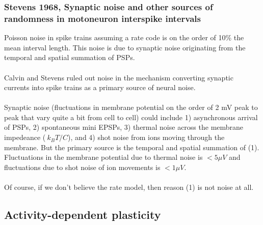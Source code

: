 \documentclass{article}
\begin{document}
\subsubsection{Stevens 1968, Synaptic noise and other sources of randomness in motoneuron interspike intervals}
Poisson noise in spike trains assuming a rate code is on the order of 10\% the mean interval length.  This noise is due to synaptic noise originating from the temporal and spatial summation of PSPs.\\
\\
Calvin and Stevens ruled out noise in the mechanism converting synaptic currents into spike trains as a primary source of neural noise.\\
\\
Synaptic noise (fluctuations in membrane potential on the order of 2 mV peak to peak that vary quite a bit from cell to cell) could include 1) asynchronous arrival of PSPs, 2) spontaneous mini EPSPs, 3) thermal noise across the membrane impedeance ($~ k_B T/C$), and 4) shot noise from ions moving through the membrane.  But the primary source is the temporal and spatial summation of (1).  Fluctuations in the membrane potential due to thermal noise is $< 5 \mu V$ and fluctuations due to shot noise of ion movements is $< 1 \mu V$. \\
\\
Of course, if we don't believe the rate model, then reason (1) is not noise at all.


\subsection{Activity-dependent plasticity}
\end{document}

